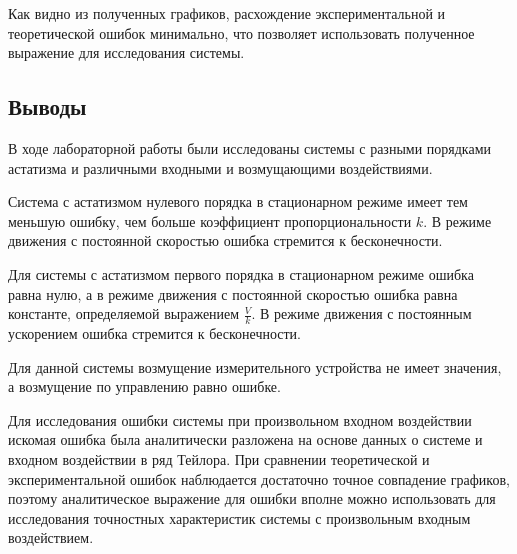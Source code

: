 \documentclass[a4paper, 11pt]{article}
\begin{document}
\par
Как видно из полученных графиков, расхождение экспериментальной и теоретической ошибок минимально, что позволяет использовать полученное выражение для исследования системы.
\newpage
\begin{center} 	
\section*{Выводы}
\end{center}
\par
В ходе лабораторной работы были исследованы системы с разными порядками астатизма и различными входными и возмущающими воздействиями. 
\par
Система с астатизмом нулевого порядка в стационарном режиме имеет тем меньшую ошибку, чем больше коэффициент пропорциональности $k$. В режиме движения с постоянной скоростью ошибка стремится к бесконечности.
\par
Для системы с астатизмом первого порядка в стационарном режиме ошибка равна нулю, а в режиме движения с постоянной скоростью ошибка равна константе, определяемой выражением $\frac{V}{k}$. В режиме движения с постоянным ускорением ошибка стремится к бесконечности.
\par
Для данной системы возмущение измерительного устройства не имеет значения, а возмущение по управлению равно ошибке.
\par
Для исследования ошибки системы при произвольном входном воздействии искомая ошибка была аналитически разложена на основе данных о системе и входном воздействии в ряд Тейлора. При сравнении теоретической и экспериментальной ошибок наблюдается достаточно точное совпадение графиков, поэтому аналитическое выражение для ошибки вполне можно использовать для исследования точностных характеристик системы с произвольным входным воздействием.
\end{document}
